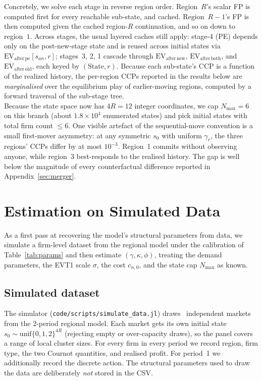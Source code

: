 \documentclass[12pt]{article}
\begin{document}
Concretely, we solve each stage in reverse region order. Region~$R$'s scalar
FP is computed first for every reachable sub-state, and cached. Region~$R-1$'s
FP is then computed given the cached region-$R$ continuation, and so on
down to region~$1$. Across stages, the usual layered caches still apply:
stage-4 (PE) depends only on the post-new-stage state and is reused across
initial states via $\mathrm{EV}_{\mathrm{after\,pe}}[s_{an}, r]$; stages~3,
2, 1 cascade through $\mathrm{EV}_{\mathrm{after\,new}}$,
$\mathrm{EV}_{\mathrm{after\,both}}$, and $\mathrm{EV}_{\mathrm{after\,old}}$,
each keyed by $(\text{State}, r)$. Because each sub-state's CCP is a function
of the realized history, the per-region CCPs reported in the results below
are \emph{marginalised} over the equilibrium play of earlier-moving regions,
computed by a forward traversal of the sub-stage tree.\\

Because the state space now has $4R = 12$ integer coordinates, we cap
$N_{\max} = 6$ on this branch (about $1.8\times 10^4$ enumerated states) and
pick initial states with total firm count $\le 6$. One visible artefact of
the sequential-move convention is a small first-mover asymmetry: at any
symmetric $s_0$ with uniform $\gamma_r$, the three regions' CCPs differ by
at most $10^{-3}$. Region~1 commits without observing anyone, while
region~3 best-responds to the realised history. The gap is well below the
magnitude of every counterfactual difference reported in
Appendix~\ref{sec:merger}.

\section{Estimation on Simulated Data}
\label{sec:estimation}

As a first pass at recovering the model's structural parameters from data,
we simulate a firm-level dataset from the regional model under the
calibration of Table~\ref{tab:params} and then estimate
$(\gamma, \kappa, \phi)$, treating the demand parameters, the EVT1 scale
$\sigma$, the cost $c_{n,0}$, and the state cap $N_{\max}$ as known.

\subsection{Simulated dataset}

The simulator (\texttt{code/scripts/simulate\_data.jl}) draws \NumMarkets\
independent markets from the 2-period regional model. Each market gets its
own initial state $s_0 \sim \mathrm{unif}\{0,1,2\}^{4R}$ (rejecting empty or
over-capacity draws), so the panel covers a range of local cluster sizes.
For every firm in every period we record region, firm type, the two Cournot
quantities, and realised profit. For period~1 we additionally record the
discrete action. The structural parameters used to draw the data are
deliberately \emph{not} stored in the CSV.
\end{document}
